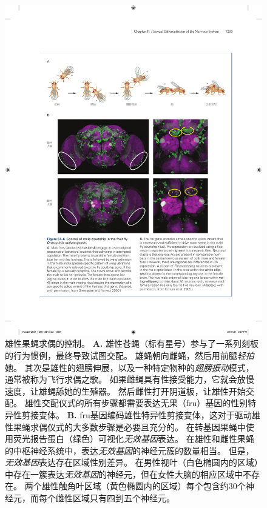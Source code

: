 \begin{figure}[htbp]
	\centering
	\includegraphics[width=1.0\linewidth]{chap51/fig_51_6}
	\caption{雄性果蝇求偶的控制。
		\textbf{A.} 雄性苍蝇（标有星号）参与了一系列刻板的行为惯例，最终导致试图交配。
		雄蝇朝向雌蝇，然后用前腿\textit{轻拍}她。
		其次是雄性的翅膀伸展，以及一种特定物种的\textit{翅膀振动}模式，通常被称为飞行求偶之歌。
		如果雌蝇具有性接受能力，它就会放慢速度，让雄蝇舔她的生殖器。
		然后雌性打开阴道板，让雄性开始交配。
		雄性交配仪式的所有步骤都需要表达无果（fru）基因的性别特异性剪接变体\cite{greenspan2000courtship}。
		\textbf{B.} fru基因编码雄性特异性剪接变体，这对于驱动雄性果蝇求偶仪式的大多数步骤是必要且充分的。
		在转基因果蝇中使用荧光报告蛋白（绿色）可视化\textit{无效基因}表达。
		在雄性和雌性果蝇的中枢神经系统中，表达\textit{无效基因}的神经元簇的数量相当。
		但是，\textit{无效基因}表达存在区域性别差异。
		在男性视叶（白色椭圆内的区域）中存在一簇表达\textit{无效基因}的神经元，但在女性大脑的相应区域中不存在。
		两个雄性触角叶区域（黄色椭圆内的区域）每个包含约30个神经元，而每个雌性区域只有四到五个神经元\cite{kimura2005fruitless}。}
	\label{fig:51_6}
\end{figure}


